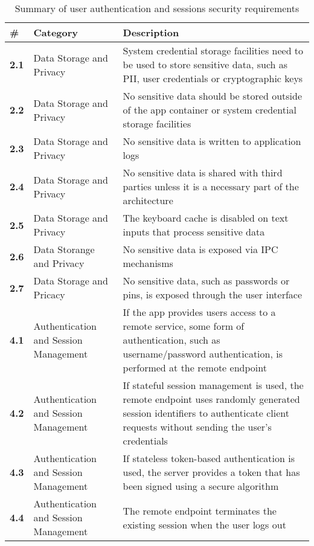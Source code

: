 \begin{table}
    \centering
    \caption{Summary of user authentication and sessions security requirements}
    \label{tab:auth-and-session-summary-requirements}
    \begin{tabulary}{0.5\textwidth}{|l|L|L|}
        \hline
        \textbf{\#} & \textbf{Category} & \textbf{Description} \\
        \hline
        \textbf{2.1} & Data Storage and Privacy & System credential storage facilities need to be used to store sensitive data, such as PII, user credentials or cryptographic keys \\
        \hline
        \textbf{2.2} & Data Storage and Privacy & No sensitive data should be stored outside of the app container or system credential storage facilities \\
        \hline
        \textbf{2.3} & Data Storage and Privacy & No sensitive data is written to application logs\\
        \hline
        \textbf{2.4} & Data Storage and Privacy & No sensitive data is shared with third parties unless it is a necessary part of the architecture \\
        \hline
        \textbf{2.5} & Data Storage and Privacy & The keyboard cache is disabled on text inputs that process sensitive data \\
        \hline
        \textbf{2.6} & Data Storange and Privacy & No sensitive data is exposed via IPC mechanisms \\
        \hline
        \textbf{2.7} & Data Storage and Pricacy &  No sensitive data, such as passwords or pins, is exposed through the user interface \\
        \hline 
        \textbf{4.1} & Authentication and Session Management & If the app provides users access to a remote service, some form of authentication, such as username/password authentication, is performed at the remote endpoint \\
        \hline
        \textbf{4.2} & Authentication and Session Management & If stateful session management is used, the remote endpoint uses randomly generated session identifiers to authenticate client requests without sending the user's credentials\\
        \hline
        \textbf{4.3} & Authentication and Session Management & If stateless token-based authentication is used, the server provides a token that has been signed using a secure algorithm \\
        \hline
        \textbf{4.4} & Authentication and Session Management & The remote endpoint terminates the existing session when the user logs out \\

\end{tabulary}
\end{table}

